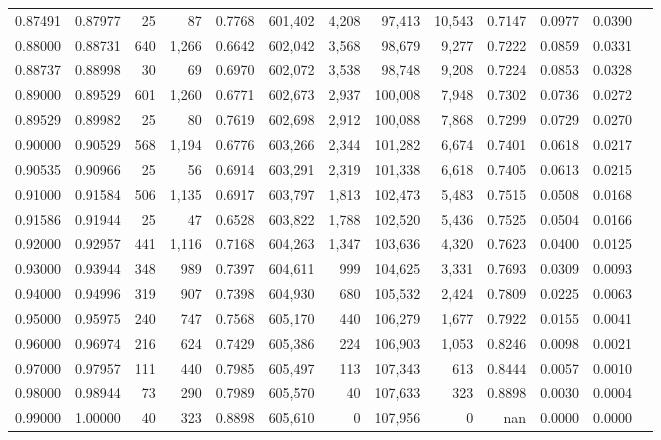 \begin{tabular}{rrrrrrrrrrrrr}
0.87491 & 0.87977 &     25 &    87 &                                     0.7768 & 601,402 &   4,208 &  97,413 &  10,543 & 0.7147 & 0.0977 & 0.0390 \\
0.88000 & 0.88731 &    640 & 1,266 &                                     0.6642 & 602,042 &   3,568 &  98,679 &   9,277 & 0.7222 & 0.0859 & 0.0331 \\
0.88737 & 0.88998 &     30 &    69 &                                     0.6970 & 602,072 &   3,538 &  98,748 &   9,208 & 0.7224 & 0.0853 & 0.0328 \\
0.89000 & 0.89529 &    601 & 1,260 &                                     0.6771 & 602,673 &   2,937 & 100,008 &   7,948 & 0.7302 & 0.0736 & 0.0272 \\
0.89529 & 0.89982 &     25 &    80 &                                     0.7619 & 602,698 &   2,912 & 100,088 &   7,868 & 0.7299 & 0.0729 & 0.0270 \\
0.90000 & 0.90529 &    568 & 1,194 &                                     0.6776 & 603,266 &   2,344 & 101,282 &   6,674 & 0.7401 & 0.0618 & 0.0217 \\
0.90535 & 0.90966 &     25 &    56 &                                     0.6914 & 603,291 &   2,319 & 101,338 &   6,618 & 0.7405 & 0.0613 & 0.0215 \\
0.91000 & 0.91584 &    506 & 1,135 &                                     0.6917 & 603,797 &   1,813 & 102,473 &   5,483 & 0.7515 & 0.0508 & 0.0168 \\
0.91586 & 0.91944 &     25 &    47 &                                     0.6528 & 603,822 &   1,788 & 102,520 &   5,436 & 0.7525 & 0.0504 & 0.0166 \\
0.92000 & 0.92957 &    441 & 1,116 &                                     0.7168 & 604,263 &   1,347 & 103,636 &   4,320 & 0.7623 & 0.0400 & 0.0125 \\
0.93000 & 0.93944 &    348 &   989 &                                     0.7397 & 604,611 &     999 & 104,625 &   3,331 & 0.7693 & 0.0309 & 0.0093 \\
0.94000 & 0.94996 &    319 &   907 &                                     0.7398 & 604,930 &     680 & 105,532 &   2,424 & 0.7809 & 0.0225 & 0.0063 \\
0.95000 & 0.95975 &    240 &   747 &                                     0.7568 & 605,170 &     440 & 106,279 &   1,677 & 0.7922 & 0.0155 & 0.0041 \\
0.96000 & 0.96974 &    216 &   624 &                                     0.7429 & 605,386 &     224 & 106,903 &   1,053 & 0.8246 & 0.0098 & 0.0021 \\
0.97000 & 0.97957 &    111 &   440 &                                     0.7985 & 605,497 &     113 & 107,343 &     613 & 0.8444 & 0.0057 & 0.0010 \\
0.98000 & 0.98944 &     73 &   290 &                                     0.7989 & 605,570 &      40 & 107,633 &     323 & 0.8898 & 0.0030 & 0.0004 \\
0.99000 & 1.00000 &     40 &   323 &                                     0.8898 & 605,610 &       0 & 107,956 &       0 &    nan & 0.0000 & 0.0000 \\
\bottomrule
\end{tabular}
